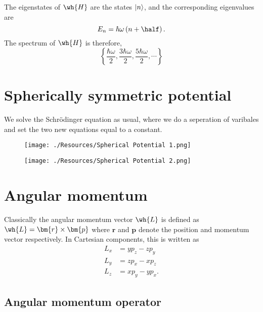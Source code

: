 \documentclass[12pt, a4paper]{article}
\begin{document}
\begin{mdthm}
    The eigenstates of \(\wh{H}\) are the states \(\ket{n}\), and the corresponding eigenvalues are 
    \[E_n = \hbar \omega \left( n+\half \right).\]
    The spectrum of \(\wh{H}\) is therefore, 
    \[\left\{ \frac{\hbar \omega}{2},\frac{3\hbar \omega}{2},\frac{5\hbar \omega}{2},\cdots \right\}\]
\end{mdthm}

\section{Spherically symmetric potential}

\begin{mdnote}
    We solve the Schrödinger equation as usual, where we do a seperation of varibales and set the two new equations equal to a constant.
\end{mdnote}

\begin{figure}[H]
     \begin{center}
        \texttt{[image: ./Resources/Spherical Potential 1.png]}
     \end{center}
\end{figure}

\begin{figure}[H]
     \begin{center}
        \texttt{[image: ./Resources/Spherical Potential 2.png]}
     \end{center}
\end{figure}

\section{Angular momentum}

Classically the angular momentum vector \(\wh{L}\) is defined as \(\wh{L} = \bm{r} \times \bm{p}\) where \(\bm{r}\) and \(\bm{p}\) denote the position and momentum vector respectively. In Cartesian components, this is written as 
\[\begin{aligned}
    L_x &= yp_z-zp_y \\
    L_y &= zp_x -xp_z \\
    L_z &= xp_y -yp_x.
\end{aligned}\]

\subsection{Angular momentum operator}
\end{document}
